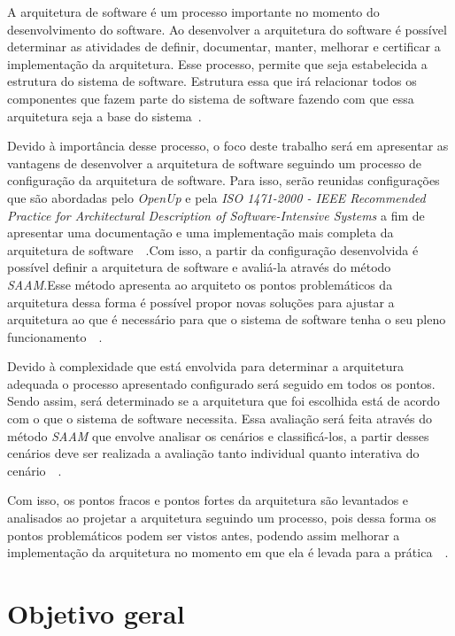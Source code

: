 A arquitetura de software é um processo importante no momento do desenvolvimento do software. Ao desenvolver a arquitetura do software é possível determinar as atividades de definir, documentar, manter, melhorar e certificar a implementação da arquitetura. Esse processo, permite que seja estabelecida a estrutura do sistema de software. Estrutura essa que irá relacionar todos os componentes que fazem parte do sistema de software fazendo com que essa arquitetura seja a base do sistema~\cite{ISO_1471}.

Devido à importância desse processo, o foco deste trabalho será em apresentar as vantagens de desenvolver a arquitetura de software seguindo um processo de configuração da arquitetura de software. Para isso, serão reunidas configurações que são abordadas pelo \emph{\acrfull{OpenUp}} e pela \emph{ISO 1471-2000 - IEEE Recommended Practice for Architectural Description of Software-Intensive Systems} a fim de apresentar uma documentação e uma implementação mais completa da arquitetura de software~\cite{ISO_1471}~\cite{openup}.Com isso, a partir da configuração desenvolvida é possível definir a arquitetura de software e avaliá-la através do método \emph{\acrfull{SAAM}}.Esse método apresenta ao arquiteto os pontos problemáticos da arquitetura dessa forma é possível propor novas soluções para ajustar a arquitetura ao que é necessário para que o sistema de software tenha o seu pleno funcionamento~\cite{survey_methods}~\cite{scenario_methods}.

Devido à complexidade que está envolvida para determinar a arquitetura adequada o processo apresentado configurado será seguido em todos os pontos. Sendo assim, será determinado se a arquitetura que foi escolhida está de acordo com o que o sistema de software necessita. Essa avaliação será feita através do método \emph{\acrfull{SAAM}} que envolve analisar os cenários e classificá-los, a partir desses cenários deve ser realizada a avaliação tanto individual quanto interativa do cenário~\cite{survey_methods}~\cite{scenario_methods}.

Com isso, os pontos fracos e pontos fortes da arquitetura são levantados e analisados ao projetar a arquitetura seguindo um processo, pois dessa forma os pontos problemáticos podem ser vistos antes, podendo assim melhorar a implementação da arquitetura no momento em que ela é levada para a prática~\cite{survey_methods}~\cite{scenario_methods}.


\section{Objetivo geral}

